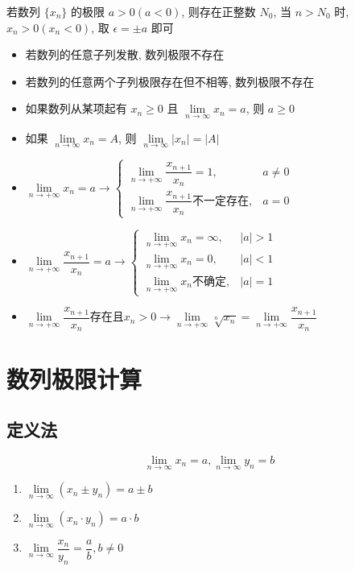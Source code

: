 \begin{corollary}[保号性]
	若数列 $\{x_{n}\}$ 的极限 $a>0(a<0)$, 则存在正整数 $N_{0}$, 当 $n>N_{0}$ 时, $x_{n}>0(x_{n}<0)$, 取 $\epsilon = \pm a$ 即可
\end{corollary}
\begin{anymark}[注]
	\begin{itemize}
		\item 若数列的任意子列发散, 数列极限不存在
		\item 若数列的任意两个子列极限存在但不相等, 数列极限不存在
	\end{itemize}
\end{anymark}
\begin{corollary}[数列极限]
	\begin{itemize}
		\item 如果数列从某项起有 $x_{n}\geq 0$ 且 $\lim\limits_{n\to\infty}x_{n} = a$, 则 $a\geq 0$
		\item 如果 $\lim\limits_{n\to\infty} x_{n} = A$, 则 $\lim\limits_{n\to\infty} |x_{n}| = |A|$
		\item $\lim\limits_{n\to +\infty}x_{n}=a\to \begin{cases} \lim\limits_{n\to +\infty}\dfrac{x_{n+1}}{x_{n}}=1, & a\neq 0\\ \lim\limits_{n\to +\infty}\dfrac{x_{n+1}}{x_{n}} \text{不一定存在}, & a=0  \end{cases}$
		\item $\lim\limits_{n\to +\infty}\dfrac{x_{n+1}}{x_{n}}=a\to \begin{cases} \lim\limits_{n\to +\infty}x_{n}=\infty,& |a|>1  \\ \lim\limits_{n\to +\infty}x_{n}=0,&|a|<1\\  \lim\limits_{n\to +\infty}x_{n}\text{不确定},&|a|=1 \end{cases}$
		\item $\lim\limits_{n\to +\infty}\dfrac{x_{n+1}}{x_{n}}\text{存在且}x_{n}>0\to \lim\limits_{n\to +\infty}\sqrt[n]{x_{n}}=\lim\limits_{n\to +\infty}\dfrac{x_{n+1}}{x_{n}}$
	\end{itemize}
\end{corollary}

\section{数列极限计算}
\subsection{定义法}
\begin{definition}[极限的四则运算]
	$$\lim\limits_{n\to \infty}x_{n}=a,\lim\limits_{n\to \infty}y_{n}=b$$
	\begin{enumerate}
		\item $\lim\limits_{n\to \infty}(x_{n}\pm y_{n}) = a\pm b$
		\item $\lim\limits_{n\to \infty}(x_{n}\cdot y_{n}) = a\cdot b$
		\item $\lim\limits_{n\to \infty}\dfrac{x_{n}}{y_{n}} = \dfrac{a}{b}, b\neq 0$
	\end{enumerate}

\end{definition}
